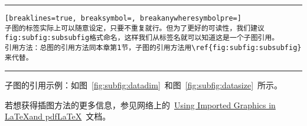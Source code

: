 \noindent\hrule

\begin{Verbatim}[breaklines=true, breaksymbol=, breakanywheresymbolpre=]
子图的标签实际上可以随意设定，只要不重复就行。但为了更好的可读性，我们建议fig:subfig:subsubfig格式命名，这样我们从标签名就可以知道这是一个子图引用。
引用方法：总图的引用方法同本章第1节，子图的引用方法用\ref{fig:subfig:subsubfig}来代替。
\end{Verbatim}

\noindent\hrule\vspace{1em}

子图的引用示例：如图~\ref{fig:subfig:datadim}~和图~\ref{fig:subfig:datasize}~所示。

若想获得插图方法的更多信息，参见网络上的~\href{ftp://ftp.tex.ac.uk/tex-archive/info/epslatex.pdf}{Using Imported Graphics in \LaTeX and pdf\LaTeX}~文档。
